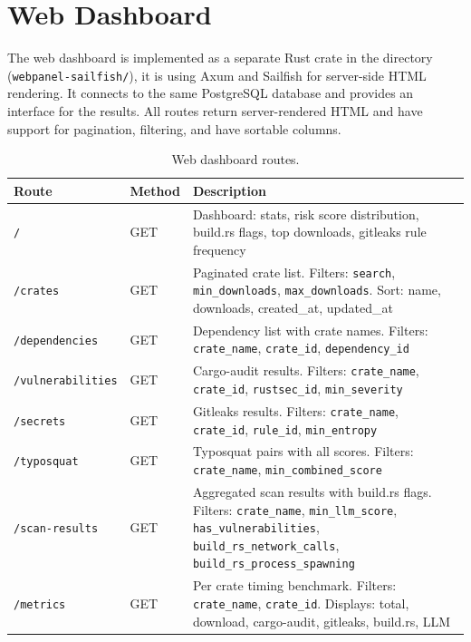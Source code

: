 \chapter{Web Dashboard}\label{appendix:web-dashboard}

The web dashboard is implemented as a separate Rust crate in the directory (\texttt{webpanel-sailfish/}), it is using Axum and Sailfish for server-side HTML rendering. It connects to the same PostgreSQL database and provides an interface for the results. All routes return server-rendered HTML and have support for pagination, filtering, and have sortable columns.

\begin{table}[h]
\centering
\caption{Web dashboard routes.}\label{tab:web-routes}
\begin{tabular}{|l|l|p{6.5cm}|}
\hline
\textbf{Route} & \textbf{Method} & \textbf{Description} \\
\hline
\texttt{/} & GET & Dashboard: stats, risk score distribution, build.rs flags, top downloads, gitleaks rule frequency \\
\hline
\texttt{/crates} & GET & Paginated crate list. Filters: \texttt{search}, \texttt{min\_downloads}, \texttt{max\_downloads}. Sort: name, downloads, created\_at, updated\_at \\
\hline
\texttt{/dependencies} & GET & Dependency list with crate names. Filters: \texttt{crate\_name}, \texttt{crate\_id}, \texttt{dependency\_id} \\
\hline
\texttt{/vulnerabilities} & GET & Cargo-audit results. Filters: \texttt{crate\_name}, \texttt{crate\_id}, \texttt{rustsec\_id}, \texttt{min\_severity} \\
\hline
\texttt{/secrets} & GET & Gitleaks results. Filters: \texttt{crate\_name}, \texttt{crate\_id}, \texttt{rule\_id}, \texttt{min\_entropy} \\
\hline
\texttt{/typosquat} & GET & Typosquat pairs with all scores. Filters: \texttt{crate\_name}, \texttt{min\_combined\_score} \\
\hline
\texttt{/scan-results} & GET & Aggregated scan results with build.rs flags. Filters: \texttt{crate\_name}, \texttt{min\_llm\_score}, \texttt{has\_vulnerabilities}, \texttt{build\_rs\_network\_calls}, \texttt{build\_rs\_process\_spawning} \\
\hline
\texttt{/metrics} & GET & Per crate timing benchmark. Filters: \texttt{crate\_name}, \texttt{crate\_id}. Displays: total, download, cargo-audit, gitleaks, build.rs, LLM \\
\hline
\end{tabular}
\end{table}